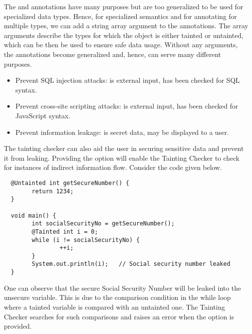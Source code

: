 
The  and  annotations have many purposes but are too generalized to be used for
specialized data types. Hence, for specialized semantics and for annotating for multiple types, we can add
a string array argument to the annotations. The array arguments describe the types for which the object is either tainted or untainted, which can be then be used
to ensure safe data usage. Without any arguments, the annotations become generalized and, hence, can serve many
different purposes.

\begin{itemize}
\item
  Prevent SQL injection attacks:   is external input,
   has been checked for SQL syntax.
\item
  Prevent cross-site scripting attacks:   is external input,
   has been checked for JavaScript syntax.
\item
  Prevent information leakage:   is secret data,
   may be displayed to a user.
\end{itemize}

The tainting checker can also aid the user in securing sensitive data and prevent it from leaking. Providing
the  option will enable the Tainting Checker to check for instances of indirect information flow. Consider
the code given below.

\begin{Verbatim}
  @Untainted int getSecureNumber() {
        return 1234;
  }

  void main() {
        int socialSecurityNo = getSecureNumber();
        @Tainted int i = 0;
        while (i != socialSecurityNo) {
                ++i;
        }
        System.out.println(i);   // Social security number leaked
  }
\end{Verbatim}

One can observe that the secure Social Security Number will be leaked into the unsecure  variable. This is due
to the comparison condition in the while loop where a tainted variable is compared with an untainted one. The
Tainting Checker searches for such comparisons and raises an error when the  option is provided.



